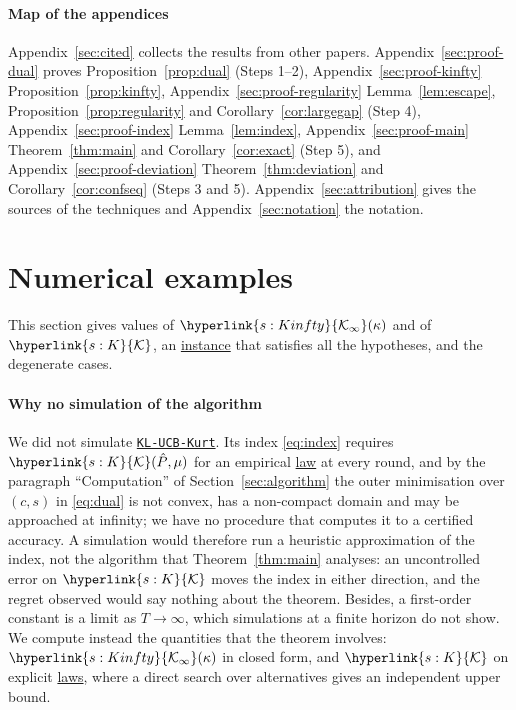 \documentclass[11pt]{article}
\newcommand{\sy}[2]{{\hyperlink{#1}{#2}}}
\newcommand{\term}[2]{\hyperlink{#1}{#2}}
\newcommand{\Kc}{\sy{s:K}{\mathcal{K}}}
\newcommand{\Kinfty}{\sy{s:Kinfty}{\mathcal{K}_{\infty}}}
\newcommand{\algo}{\hyperref[alg:kucb]{\texttt{KL-UCB-Kurt}}}
\begin{document}
\paragraph{Map of the appendices} Appendix~\ref{sec:cited} collects the results from other papers.
Appendix~\ref{sec:proof-dual} proves Proposition~\ref{prop:dual} (Steps 1--2), Appendix~\ref{sec:proof-kinfty}
Proposition~\ref{prop:kinfty}, Appendix~\ref{sec:proof-regularity} Lemma~\ref{lem:escape},
Proposition~\ref{prop:regularity} and Corollary~\ref{cor:largegap} (Step 4), Appendix~\ref{sec:proof-index}
Lemma~\ref{lem:index}, Appendix~\ref{sec:proof-main} Theorem~\ref{thm:main} and Corollary~\ref{cor:exact}
(Step 5), and Appendix~\ref{sec:proof-deviation} Theorem~\ref{thm:deviation} and Corollary~\ref{cor:confseq}
(Steps 3 and 5). Appendix~\ref{sec:attribution} gives the sources of the techniques and
Appendix~\ref{sec:notation} the notation.

\section{Numerical examples}\label{sec:examples}

This section gives values of $\Kinfty(\kappa)$ and of $\Kc$, an \term{w:instance}{instance} that satisfies all the hypotheses, and the
degenerate cases.

\paragraph{Why no simulation of the algorithm} We did not simulate \algo{}. Its index \eqref{eq:index} requires
$\Kc(\hat P,\mu)$ for an empirical \term{w:law}{law} at every round, and by the paragraph ``Computation'' of
Section~\ref{sec:algorithm} the outer minimisation over $(c,s)$ in \eqref{eq:dual} is not convex, has a non-compact domain
and may be approached at infinity; we have no procedure that computes it to a certified accuracy. A simulation would
therefore run a heuristic approximation of the index, not the algorithm that Theorem~\ref{thm:main} analyses: an
uncontrolled error on $\Kc$ moves the index in either direction, and the regret observed would say nothing about the
theorem. Besides, a first-order constant is a limit as $T\to\infty$, which simulations at a finite horizon do not
show. We compute instead the quantities that the theorem involves:
$\Kinfty(\kappa)$ in closed form, and $\Kc$ on explicit \term{w:law}{laws}, where a direct search over alternatives gives an
independent upper bound.
\end{document}
